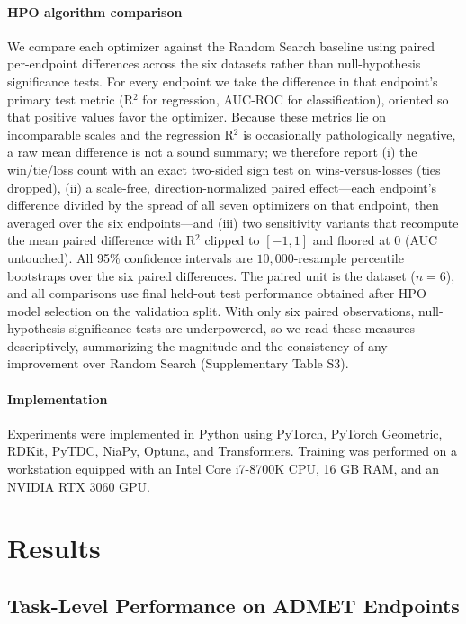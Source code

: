 \documentclass[journal]{IEEEtran}
\begin{document}
\paragraph{HPO algorithm comparison}
We compare each optimizer against the Random Search baseline using paired per-endpoint differences across the six datasets rather than null-hypothesis significance tests. For every endpoint we take the difference in that endpoint's primary test metric (R$^2$ for regression, AUC-ROC for classification), oriented so that positive values favor the optimizer. Because these metrics lie on incomparable scales and the regression R$^2$ is occasionally pathologically negative, a raw mean difference is not a sound summary; we therefore report (i) the win/tie/loss count with an exact two-sided sign test on wins-versus-losses (ties dropped), (ii) a scale-free, direction-normalized paired effect---each endpoint's difference divided by the spread of all seven optimizers on that endpoint, then averaged over the six endpoints---and (iii) two sensitivity variants that recompute the mean paired difference with R$^2$ clipped to $[-1,1]$ and floored at $0$ (AUC untouched). All 95\% confidence intervals are $10{,}000$-resample percentile bootstraps over the six paired differences. The paired unit is the dataset ($n=6$), and all comparisons use final held-out test performance obtained after HPO model selection on the validation split. With only six paired observations, null-hypothesis significance tests are underpowered, so we read these measures descriptively, summarizing the magnitude and the consistency of any improvement over Random Search (Supplementary Table S3).

\paragraph{Implementation}
Experiments were implemented in Python using PyTorch, PyTorch Geometric, RDKit, PyTDC, NiaPy, Optuna, and Transformers. Training was performed on a workstation equipped with an Intel Core i7-8700K CPU, 16 GB RAM, and an NVIDIA RTX 3060 GPU.


\section{Results}
\label{sec:results}

\subsection{Task-Level Performance on ADMET Endpoints}
\label{sec:task_level}
\end{document}
